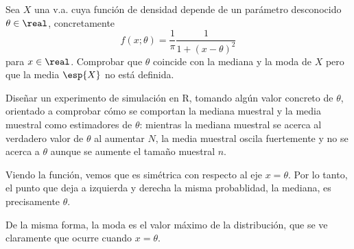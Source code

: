 \begin{problem}[5] Sea $X$ una v.a. cuya función de densidad depende de un parámetro desconocido $\theta \in \real$, concretamente \[ f(x;\theta) = \frac{1}{\pi}\frac{1}{1+(x-\theta)^2} \] para $x\in \real$. Comprobar que $\theta$ coincide con la mediana y la moda de $X$ pero que la media $\esp{X}$ no está definida.

Diseñar un experimento de simulación en R, tomando algún valor concreto de $\theta$, orientado a comprobar cómo se comportan la mediana muestral y la media muestral como estimadores de $\theta$: mientras la mediana muestral se acerca al verdadero valor de $\theta$ al aumentar $N$, la media muestral oscila fuertemente y no se acerca a $\theta$ aunque se aumente el tamaño muestral $n$.

\solution Viendo la función, vemos que es simétrica con respecto al eje $x= \theta$. Por lo tanto, el punto que deja a izquierda y derecha la misma probablidad, la mediana, es precisamente $\theta$. 

De la misma forma, la moda es el valor máximo de la distribución, que se ve claramente que ocurre cuando $x=\theta$.
\end{problem}

